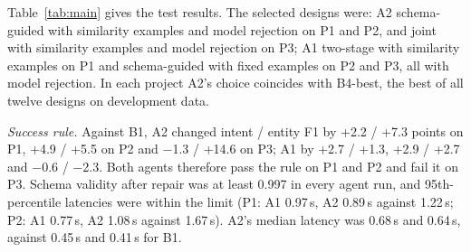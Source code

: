 \documentclass[conference]{IEEEtran}
\newcommand{\oos}{\textsc{oos}}
\begin{document}
\begin{table}[t]
\centering
\caption{Test results. Intent macro-F1 / entity span F1 / \oos{} F1. Best LM-based result per column in bold. B4-random reports the mean intent macro-F1 of five seeds, with the range.}
\label{tab:main}
\small
\setlength{\tabcolsep}{5pt}
\end{table}

Table~\ref{tab:main} gives the test results. The selected designs were: A2 schema-guided with similarity examples and model rejection on P1 and P2, and joint with similarity examples and model rejection on P3; A1 two-stage with similarity examples on P1 and schema-guided with fixed examples on P2 and P3, all with model rejection. In each project A2's choice coincides with B4-best, the best of all twelve designs on development data.


\emph{Success rule.} Against B1, A2 changed intent / entity F1 by +2.2 / +7.3 points on P1, +4.9 / +5.5 on P2 and $-$1.3 / +14.6 on P3; A1 by +2.7 / +1.3, +2.9 / +2.7 and $-$0.6 / $-$2.3. Both agents therefore pass the rule on P1 and P2 and fail it on P3. Schema validity after repair was at least 0.997 in every agent run, and 95th-percentile latencies were within the limit (P1: A1 0.97\,s, A2 0.89\,s against 1.22\,s; P2: A1 0.77\,s, A2 1.08\,s against 1.67\,s). A2's median latency was 0.68\,s and 0.64\,s, against 0.45\,s and 0.41\,s for B1.
\end{document}
